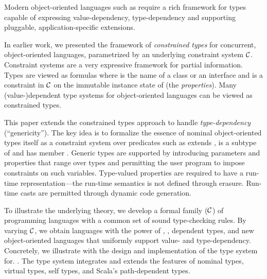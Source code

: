 Modern object-oriented languages such as \Xten{} require a rich
framework for types capable of expressing value-dependency,
type-dependency and supporting pluggable, application-specific
extensions.

In earlier work, we presented the framework of \emph{constrained types}
for concurrent, object-oriented languages, parametrized by an
underlying constraint system $\cal C$. Constraint systems are a very
expressive framework for partial information. Types are viewed as
formulas  where  is the name of a class or an interface
and
 is a constraint in $\cal C$ on the immutable instance state of
 (the \emph{properties}). Many (value-)dependent type systems
for object-oriented languages can be viewed as constrained types.

This paper extends the constrained types approach to handle
\emph{type-dependency} (``genericity''). The key idea is to formalize the
essence of nominal object-oriented types itself as a constraint system
over predicates such as  extends ,  is a subtype
of  and  has member . Generic types are supported
by introducing parameters and properties that range over types and
permitting the user program to impose constraints on such
variables. Type-valued properties are required to have a run-time
representation---the run-time semantics is not defined through
erasure. Run-time casts are permitted through dynamic code generation.

To illustrate the underlying theory, we develop a formal family
\FX(${\cal C}$) of programming languages with a common set of sound
type-checking rules.  By varying $\cal C$, we obtain languages with
the power of \FJ, \FGJ, dependent types, and new object-oriented languages that
uniformly support value- and type-dependency.  Concretely, we
illustrate with the design and implementation of the type system for.
\Xten{}.  The type system integrates and extends the features of
nominal types, virtual types, self types, and Scala's path-dependent
types.
